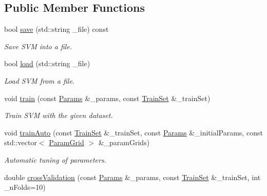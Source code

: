 \subsection*{Public Member Functions}
\begin{DoxyCompactItemize}
\item 
bool \hyperlink{classsvmpp_1_1Svm_a69d47865f2470e27aa93244d7dafe04f}{save} (std\+::string \+\_\+file) const \hypertarget{classsvmpp_1_1Svm_a69d47865f2470e27aa93244d7dafe04f}{}\label{classsvmpp_1_1Svm_a69d47865f2470e27aa93244d7dafe04f}

\begin{DoxyCompactList}\small\item\em Save S\+VM into a file. \end{DoxyCompactList}\item 
bool \hyperlink{classsvmpp_1_1Svm_ae1d7700a28b8480fd6d907eceb19e613}{load} (std\+::string \+\_\+file)\hypertarget{classsvmpp_1_1Svm_ae1d7700a28b8480fd6d907eceb19e613}{}\label{classsvmpp_1_1Svm_ae1d7700a28b8480fd6d907eceb19e613}

\begin{DoxyCompactList}\small\item\em Load S\+VM from a file. \end{DoxyCompactList}\item 
void \hyperlink{classsvmpp_1_1Svm_a4ba54f151b53eb2ef9e6b059a92b730b}{train} (const \hyperlink{classsvmpp_1_1Svm_a5ec13b8f62c2deb4b4229a2305c32c03}{Params} \&\+\_\+params, const \hyperlink{structsvmpp_1_1TrainSet}{Train\+Set} \&\+\_\+train\+Set)\hypertarget{classsvmpp_1_1Svm_a4ba54f151b53eb2ef9e6b059a92b730b}{}\label{classsvmpp_1_1Svm_a4ba54f151b53eb2ef9e6b059a92b730b}

\begin{DoxyCompactList}\small\item\em Train S\+VM with the given dataset. \end{DoxyCompactList}\item 
void \hyperlink{classsvmpp_1_1Svm_a6681b59a216212e4cb3f59e777bdbb2d}{train\+Auto} (const \hyperlink{structsvmpp_1_1TrainSet}{Train\+Set} \&\+\_\+train\+Set, const \hyperlink{classsvmpp_1_1Svm_a5ec13b8f62c2deb4b4229a2305c32c03}{Params} \&\+\_\+initial\+Params, const std\+::vector$<$ \hyperlink{structsvmpp_1_1ParamGrid}{Param\+Grid} $>$ \&\+\_\+param\+Grids)\hypertarget{classsvmpp_1_1Svm_a6681b59a216212e4cb3f59e777bdbb2d}{}\label{classsvmpp_1_1Svm_a6681b59a216212e4cb3f59e777bdbb2d}

\begin{DoxyCompactList}\small\item\em Automatic tuning of parameters. \end{DoxyCompactList}\item 
double \hyperlink{classsvmpp_1_1Svm_a5ec9d97a46947bca0e5641ba4325b174}{cross\+Validation} (const \hyperlink{classsvmpp_1_1Svm_a5ec13b8f62c2deb4b4229a2305c32c03}{Params} \&\+\_\+params, const \hyperlink{structsvmpp_1_1TrainSet}{Train\+Set} \&\+\_\+train\+Set, int \+\_\+n\+Folds=10)\hypertarget{classsvmpp_1_1Svm_a5ec9d97a46947bca0e5641ba4325b174}{}\label{classsvmpp_1_1Svm_a5ec9d97a46947bca0e5641ba4325b174}


\end{DoxyCompactItemize}
